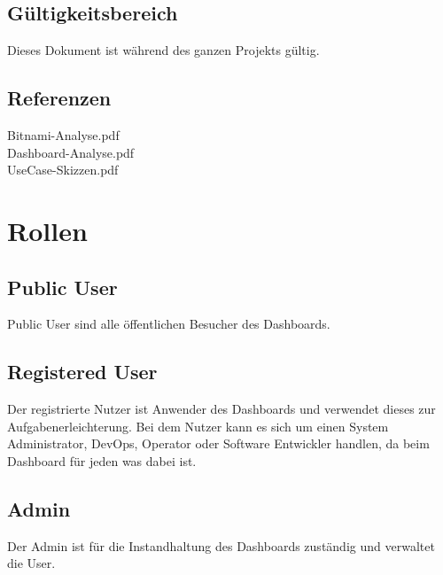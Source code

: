 \documentclass[11pt]{scrartcl}
\begin{document}
\subsection{Gültigkeitsbereich}

Dieses Dokument ist während des ganzen Projekts gültig.


\subsection{Referenzen}
Bitnami-Analyse.pdf\\
Dashboard-Analyse.pdf\\
UseCase-Skizzen.pdf

\section{Rollen}
\subsection{Public User}
Public User sind alle öffentlichen Besucher des Dashboards.

\subsection{Registered User}
Der registrierte Nutzer ist Anwender des Dashboards und verwendet dieses zur 
Aufgabenerleichterung.
Bei dem Nutzer kann es sich um einen System Administrator, DevOps, Operator oder
Software Entwickler handlen, da beim Dashboard für jeden was dabei ist.

\subsection{Admin}
Der Admin ist für die Instandhaltung des Dashboards zuständig und verwaltet die 
User.
\end{document}
